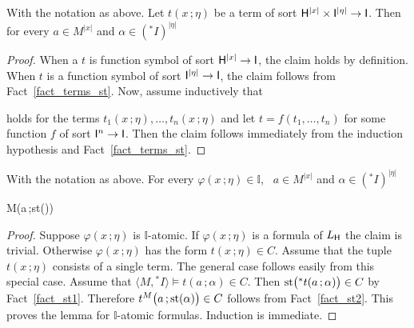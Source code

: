 \documentclass[10pt,oneside]{amsproc}
\begin{document}
\begin{fact}\label{fact_st2} 
  With the notation as above.
  Let $t(x\,;\eta)$ be a term of sort ${\sf H}^{|x|}\times{\sf I}^{|\eta|}\to {\sf I}$.
  Then for every $a\in M^{|x|}$ and $\alpha\in({}^*\!I)^{|\eta|}$

\end{fact}
\begin{proof}
  When a $t$ is function symbol of sort  ${\sf H}^{|x|}\to {\sf I}$, the claim holds by definition.
  When $t$ is a function symbol of sort ${\sf I}^{|\eta|}\to {\sf I}$, the claim follows from Fact~\ref{fact_terms_st}.
  Now, assume inductively that 


  holds for the terms $t_1(x\,;\eta),\dots,t_n(x\,;\eta)$ and let $t=f(t_1,\dots,t_n)$ for some function $f$ of sort ${\sf I}^n\to {\sf I}$.
  Then the claim follows immediately from the induction hypothesis and Fact~\ref{fact_terms_st}.
\end{proof}


\begin{lemma}\label{lem_st}
  With the notation as above.
  For every $\varphi(x\,;\eta)\in\mathds{I}$, \  $a\in M^{|x|}$ and $\alpha\in({}^*\!I)^{|\eta|}$ 
  
  {\Rightarrow}
  {M\models\varphi\big(a\,;{\rm st}(\alpha)\big)}
\end{lemma}

\begin{proof}
  Suppose $\varphi(x\,;\eta)$ is $\mathds{I}$-atomic.
  If $\varphi(x\,;\eta)$ is a formula of $L_{\sf H}$ the claim is trivial. 
  Otherwise $\varphi(x\,;\eta)$ has the form $t(x\,;\eta)\in C$.
  Assume that the tuple $t(x\,;\eta)$ consists of a single term.
  The general case follows easily from this special case. 
  Assume that $\langle M,{}^*\!I\rangle\models t(a\,;\alpha)\in C$.
  Then ${\rm st}\big({}^*t(a\,;\alpha)\big)\in C$ by Fact~\ref{fact_st1}.
  Therefore $t^M\big(a\,;{\rm st}(\alpha)\big)\in C$ follows from Fact~\ref{fact_st2}.
  This proves the lemma for $\mathds{I}$-atomic formulas.
  Induction is immediate. 
\end{proof}
\end{document}
